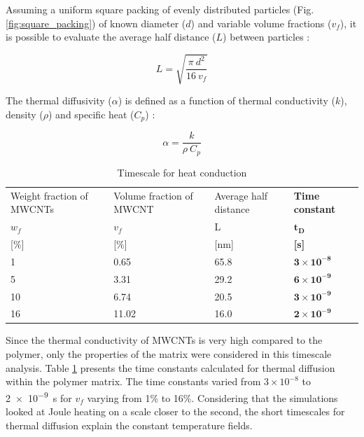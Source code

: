 \documentclass[11pt,review,times]{elsarticle}
\begin{document}
Assuming a uniform square packing of evenly distributed particles (Fig. \ref{fig:square_packing}) of known diameter ($d$) and variable volume fractions ($v_f$), it is possible to evaluate the average half distance ($L$) between particles :

\begin{equation}
	L = \sqrt{\frac{\pi \ d^2}{16 \ v_f}}
	\label{equa:L_average}
\end{equation}

The thermal diffusivity ($\alpha$) is defined as a function of thermal conductivity ($k$), density ($\rho$) and specific heat ($C_p$) : 

\begin{equation}
	\alpha = \frac{k}{\rho \ C_p}
	\label{equa:thermal_diffusivity}
\end{equation}

\begin{table}[htb]
\centering
\begin{tabular}{@{}p{2.4cm}p{2.5cm}p{2cm}p{1.5cm}@{}}
\toprule
Weight fraction of MWCNTs	& Volume fraction of MWCNT	& Average half distance 	& \textbf{Time constant}  		\\ %
$w_f$								& $v_f$ 							& L 							& $\mathbf{t_D}$            	\\
{[}\%{]}							& {[}\%{]	}						& {[}nm{]} 					& \textbf{{[}s{]}}            	\\ \midrule
1									& 0.65 							& 65.8	 						& $\mathbf{3\times 10^{-8}}$ 	\\ 
5									& 3.31								& 29.2							& $\mathbf{6\times 10^{-9}}$	\\
10									& 6.74								& 20.5							& $\mathbf{3\times 10^{-9}}$	\\
16									& 11.02 							& 16.0 						& $\mathbf{2\times 10^{-9}}$	\\	\bottomrule
\end{tabular}%
\caption{Timescale for heat conduction}
\label{tab:results_timescale}
\end{table}

Since the thermal conductivity of MWCNTs is very high compared to the polymer, only the properties of the matrix were considered in this timescale analysis. 
Table \ref{tab:results_timescale} presents the time constants calculated for thermal diffusion within the polymer matrix. 
The time constants varied from $3 \times 10^{-8}$ to \SI{2e-9}{\second} for $v_f$ varying from 1\% to 16\%. 
Considering that the simulations looked at Joule heating on a scale closer to the second, the short timescales for thermal diffusion explain the constant temperature fields. 
\end{document}
